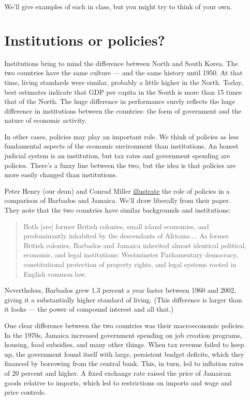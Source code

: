 We'll give examples of each in class, but you might try to think of your own.


\section{Institutions or policies?}

Institutions bring to mind the difference between North and South Korea.
The two countries have the same culture --- and the same history until 1950.
At that time, living standards were similar,
probably a little higher in the North.
Today, best estimates indicate that GDP per capita in the South
is more than 15 times that of the North.
The huge difference in performance surely reflects the huge difference
in institutions between the countries:
the form of government and the nature of economic activity.


In other cases, policies may play an important role.
We think of policies as less fundamental aspects of
the economic environment than institutions.
An honest judicial system is an institution,
but tax rates and government spending are policies.
There's a fuzzy line between the two,
but the idea is that policies are more easily
changed than institutions.

Peter Henry  
 (our dean) and Conrad Miller \href{{http://www.aeaweb.org/articles.php?doi=10.1257/aer.99.2.261}}{illustrate}
the role of policies in a comparison
of Barbados and Jamaica.
We'll draw liberally from their paper.
They note that the two countries have similar backgrounds and institutions:
\begin{quote}
Both [are] former British colonies,
small island economies,
and predominantly inhabited by the descendants of Africans....
As former British colonies, Barbados and
Jamaica inherited almost identical political,
economic, and legal institutions: Westminster
Parliamentary democracy, constitutional protection of property rights,
and legal systems rooted in English common law.
\end{quote}
Nevertheless,
Barbados grew 1.3 percent a year faster between 1960 and 2002,
giving it a substantially higher standard of living.
(This difference is larger than it looks --- the power
of compound interest and all that.)


One clear difference between the two countries was their
macroeconomic policies.
In the 1970s, Jamaica increased government spending
on job creation programs, housing, food subsidies, and many other things.
When tax revenue failed to keep up, the government found itself
with large, persistent budget deficits, which they financed by
borrowing from the central bank. 
This, in turn, led to inflation rates of 20 percent and higher.
A fixed exchange rate raised the price of Jamaican goods relative to imports,
which led to restrictions on imports and wage and price controls.

